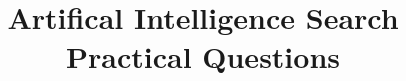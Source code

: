 \documentclass[a4paper, answers]{exam}
\title{Artifical Intelligence Search Practical Questions}
\author{}
\begin{document}
    \maketitle
    \begin{questions}
        
    \end{questions}
\end{document}
